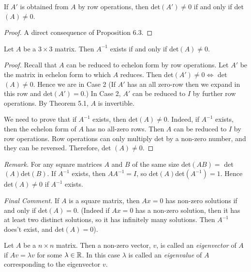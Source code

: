 \documentclass[10pt]{scrartcl}
\begin{document}
\begin{corollary} If $A'$ is obtained from $A$ by row operations, then det$(A') \neq 0$ if and only if det$(A) \neq 0$. 	
\end{corollary}


\begin{proof} A direct consequence of Proposition 6.3.\end{proof}
\vspace*{5pt}

\begin{theorem}Let $A$ be a $3 \times 3$ matrix. Then $A^{-1}$ exists if and only if det$(A) \neq 0$.	
\end{theorem}

\begin{proof}
Recall that $A$ can be reduced to echelon form by row operations. Let $A'$ be the matrix in echelon form to which $A$ reduces. Then det$(A')\neq 0 \iff$ det$(A) \neq 0$. Hence we are in Case 2 (If $A'$ has an all zero-row then we expand in this row and det$(A') = 0$.) In Case 2, $A'$ can be reduced to $I$ by further row operations. By Theorem 5.1, $A$ is invertible.

We    need to prove that if $A^{-1}$ exists, then det$(A) \neq 0$. Indeed, if $A^{-1}$ exists, then the echelon form of $A$ has no all-zero rows. Then $A$ can be reduced to $I$ by row operations. Row operations can only multiply det by a non-zero number, and they can be reversed. Therefore, det $(A) \neq 0$.	
\end{proof}\vspace*{5pt}

 \textit{Remark.} For any square matrices $A$ and $B$ of the same size det$(AB) =$ det$(A)$det$(B)$. If $A^{-1}$ exists, then $AA^{-1} = I$, so det$(A)$det$(A^{-1}) = 1$. Hence det$(A) \neq 0$ if $A^{-1}$ exists.

 \textit{Final Comment.} If $A$ is a square matrix, then $Ax = 0$ has non-zero solutions if and only if det$(A) = 0$. (Indeed if $Ax = 0$ has a non-zero solution, then it has at least two distinct solutions, so it has infinitely many solutions. Then $A^{-1}$ does't exist, and det$(A) = 0$). 





\begin{definition} Let $A$ be a $n \times n$ matrix. Then a non-zero vector, $v$, is called an \emph{eigenvector} of $A$ if $Av = \lambda v$ for some $\lambda \in \mathbb{R}$. In this case $\lambda$ is called an \emph{eigenvalue} of $A$ corresponding to the eigenvector $v$.\end{definition}
 
\end{document}
